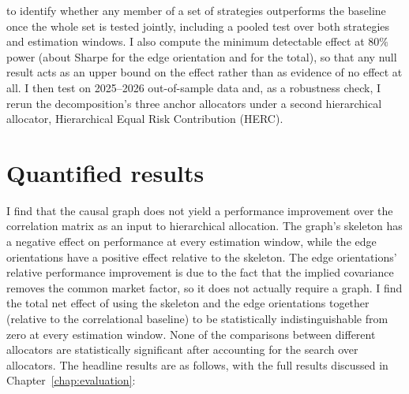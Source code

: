 \documentclass[11pt, a4paper]{report}
\begin{document}
\begin{itemize}[itemsep=2pt, topsep=3pt]
    to identify whether any member of a set of strategies outperforms the baseline once the whole set is tested jointly, including a pooled test over both strategies and
    estimation windows. 
    I also compute the minimum detectable effect at $80\%$ power
    (about \rsContrastMDEOrient{} Sharpe for the edge orientation and
    \rsContrastMDETotal{} for the total), so that any null result
    acts as an upper bound on the effect rather than as evidence of no effect at all.
    I then test on 2025--2026 out-of-sample data and, as a robustness check, I rerun the decomposition's three anchor allocators under a second hierarchical allocator, Hierarchical Equal Risk Contribution (HERC).
\end{itemize}

\section{Quantified results}
\label{sec:quantified-results}

I find that the causal graph does not yield a performance improvement over the correlation matrix as an input to hierarchical allocation. The graph's skeleton has a negative effect on performance at every estimation window, while the edge orientations have a positive effect relative to the skeleton. The edge orientations' relative performance improvement is due to the fact that the implied covariance removes the common market factor, so it does not actually require a graph. I find the total net effect of using the skeleton and the edge orientations together (relative to the correlational baseline) to be statistically indistinguishable from zero at every estimation window. None of the comparisons between different allocators are statistically significant after accounting for the search over allocators.
The headline results are as follows, with the full results discussed in
Chapter~\ref{chap:evaluation}:
\end{document}
